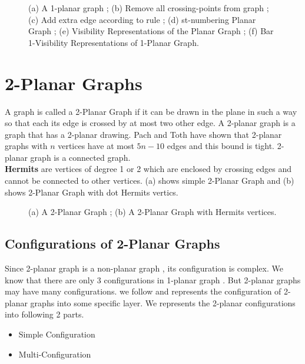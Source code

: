 \begin{figure}[!tb]
\centering
\resizebox{150mm}{!}{}
\caption{(a) A 1-planar graph ; (b) Remove all crossing-points from graph ; (c) Add extra edge according to rule ; (d) st-numbering Planar Graph ; (e) Visibility Representations of the Planar Graph ; (f) Bar 1-Visibility Representations of 1-Planar Graph.}
\label{fig:1vvv}
\end{figure}












\section{2-Planar Graphs}
\label{sec:2pg}

A graph is called a 2-Planar Graph if it can be drawn in the plane in such a way so that each its edge is crossed by at most two other edge. A 2-planar graph is a graph that has a 2-planar drawing.
Pach and Toth have shown that 2-planar graphs with $n$ vertices have at most $5n-10$ edges and this bound is tight. 2-planar graph is a connected graph.
\\
\textbf{Hermits} are vertices of degree 1 or 2 which are enclosed by crossing edges and cannot be connected to other vertices.  (a) shows simple 2-Planar Graph and (b) shows 2-Planar Graph with dot Hermits vertics.


\begin{figure}[!tb]
  \centering
\resizebox{150mm}{!}{}
\caption{(a) A 2-Planar Graph ; (b) A 2-Planar Graph with Hermits vertices.}
\label{fig:2p}
\end{figure}


\subsection{Configurations of 2-Planar Graphs}
\label{sec:c2pg}
Since 2-planar graph is a non-planar graph , its configuration is complex. We know that there are only 3 configurations in 1-planar graph \cite{alam}. But 2-planar graphs may have many configurations. we follow \cite{michael}\cite{Christopher} and represents the configuration of 2-planar graphs into some specific layer. We represents the 2-planar configurations into following 2 parts.
\begin{itemize}
\item  Simple Configuration
\item  Multi-Configuration
\end{itemize}



